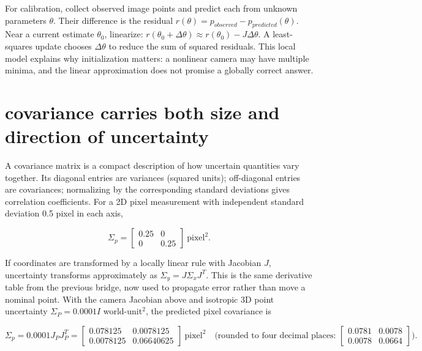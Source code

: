 For calibration, collect observed image points and predict each from unknown parameters \(\theta\). Their difference is the residual \(r(\theta)=p_{observed}-p_{predicted}(\theta)\). Near a current estimate \(\theta_0\), linearize: \(r(\theta_0+\Delta\theta)\approx r(\theta_0)-J\Delta\theta\). A least-squares update chooses \(\Delta\theta\) to reduce the sum of squared residuals. This local model explains why initialization matters: a nonlinear camera may have multiple minima, and the linear approximation does not promise a globally correct answer.

\section{covariance carries both size and direction of uncertainty}\label{02-foundations-ii-ch034-covariance-carries-both-size-and-direction-of-uncertainty}

\hypertarget{02-foundations-ii-ch034-covariance-carries-both-size-and-direction-of-uncertainty}{}

A covariance matrix is a compact description of how uncertain quantities vary together. Its diagonal entries are variances (squared units); off-diagonal entries are covariances; normalizing by the corresponding standard deviations gives correlation coefficients. For a 2D pixel measurement with independent standard deviation 0.5 pixel in each axis,

\[\Sigma_p=\begin{bmatrix}0.25&0\\0&0.25\end{bmatrix}\ \text{pixel}^2.\]

If coordinates are transformed by a locally linear rule with Jacobian \(J\), uncertainty transforms approximately as \(\Sigma_y=J\Sigma_xJ^T\). This is the same derivative table from the previous bridge, now used to propagate error rather than move a nominal point. With the camera Jacobian above and isotropic 3D point uncertainty \(\Sigma_P=0.0001I\) world-unit\(^2\), the predicted pixel covariance is

\[\Sigma_p=0.0001J_PJ_P^T=\begin{bmatrix}0.078125&0.0078125\\0.0078125&0.06640625\end{bmatrix}\ \text{pixel}^2\quad\text{(rounded to four decimal places: }\begin{bmatrix}0.0781&0.0078\\0.0078&0.0664\end{bmatrix}).\]

